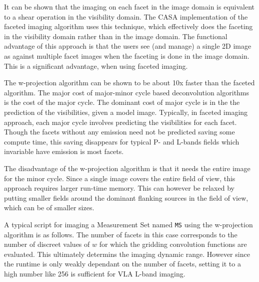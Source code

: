 It can be shown that the imaging on each facet in the image domain is
equivalent to a shear operation in the visibility domain.  The CASA
implementation of the faceted imaging algorithm uses this technique,
which effectively does the faceting in the visibility domain rather
than in the image domain.  The functional advantage of this approach is
that the users see (and manage) a single 2D image as against multiple
facet images when the faceting is done in the image domain.  This is a
significant advantage, when using faceted imaging.

\vspace{3mm}

The w-projection algorithm can be shown to be about 10x faster than the
faceted algorithm.  The major cost of major-minor cycle based
deconvolution algorithms is the cost of the major cycle.  The dominant
cost of major cycle is in the the prediction of the visibilities, given
a model image.  Typically, in faceted imaging approach, each major
cycle involves predicting the visibilities for each facet.  Though
the facets without any emission need not be predicted saving some
compute time, this saving disappears for typical P- and L-bands fields
which invariable have emission is most facets.

The disadvantage of the w-projection algorithm is that it needs the
entire image for the minor cycle.  Since a single image covers the
entire field of view, this approach requires larger run-time memory.
This can however be relaxed by putting smaller fields around the
dominant flanking sources in the field of view, which can be of
smaller sizes.

\vspace{3mm}

\vspace{3mm}

A typical script for imaging a Measurement Set named {\tt MS} using the
w-projection algorithm is as follows.  The number of facets in this
case corresponds to the number of discreet values of $w$ for which the
gridding convolution functions are evaluated.  This ultimately
determins the imaging dynamic range.  However since the runtime is
only weakly dependant on the number of facets, setting it to a high
number like 256 is sufficient for VLA L-band imaging.

